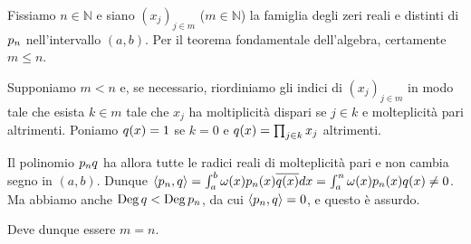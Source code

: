 \Proof Fissiamo $n \in \mathbb{N}$ e siano $(x_j)_{j \in m}$ ($m \in \mathbb{N}$) la famiglia degli zeri reali e distinti di $p_n$ nell'intervallo $(a,b)$. Per il teorema fondamentale dell'algebra, certamente $m \leq n$.
\par Supponiamo $m < n$ e, se necessario, riordiniamo gli indici di $(x_j)_{j \in m}$ in modo tale che esista $k \in m$ tale che $x_j$ ha moltiplicit\`a dispari se $j \in k$ e molteplicit\`a pari altrimenti. Poniamo $q(x) = 1$ se $k = 0$ e $q(x) = \prod_{j \in k} x_j$ altrimenti.
\par Il polinomio $p_n q$ ha allora tutte le radici reali di molteplicit\`a pari e non cambia segno in $(a,b)$. Dunque $\left \langle p_n , q \right \rangle = \int_a^b \omega(x)p_n(x)\overline{q(x)}dx = \int_a^n \omega(x)p_n(x)q(x) \neq 0$. Ma abbiamo anche $\operatorname{\operatorname{Deg}}{q} < \operatorname{\operatorname{Deg}}{p_n}$, da cui $\left \langle p_n , q \right \rangle = 0$, e questo \`e assurdo.
\par Deve dunque essere $m = n$. \EndProof

